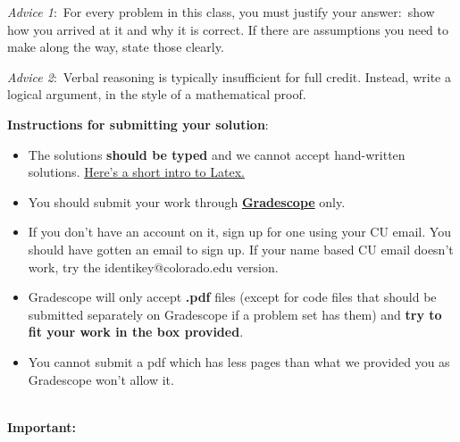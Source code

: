 \documentclass[12pt]{article}
\theoremstyle{remark}
\begin{document}
\renewcommand{\headrulewidth}{0.5pt}

\phantom{Test}

\begin{small}
\textit{Advice 1}:\ For every problem in this class, you must justify your answer:\ show how you arrived at it and why it is correct. If there are assumptions you need to make along the way, state those clearly.
\vspace{-3mm} 

\textit{Advice 2}:\ Verbal reasoning is typically insufficient for full credit. Instead, write a logical argument, in the style of a mathematical proof.\\
\vspace{-3mm} 

\textbf{Instructions for submitting your solution}:
\vspace{-5mm} 

\begin{itemize}
	\item The solutions \textbf{should be typed} and we cannot accept hand-written solutions. \href{http://ece.uprm.edu/~caceros/latex/introduction.pdf}{Here's a short intro to Latex.}
	\item You should submit your work through \href{https://www.gradescope.com/courses/59294}{\textbf{Gradescope}} only.
	\item If you don't have an account on it, sign up for one using your CU email. You should have gotten an email to sign up. If your name based CU email doesn't work, try the identikey@colorado.edu version. 
	\item Gradescope will only accept \textbf{.pdf} files (except for code files that should be submitted separately on Gradescope if a problem set has them) and \textbf{try to fit your work in the box provided}. 
	\item You cannot submit a pdf which has less pages than what we provided you as Gradescope won't allow it. 
\end{itemize}
\vspace{-4mm} 
\end{small}

\hrulefill
\pagebreak
\\
\textbf{Important:} 
\end{document}
